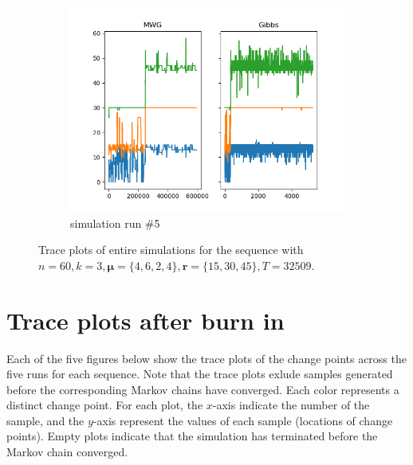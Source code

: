 \begin{figure}[H]
\begin{subfigure}{.3\textwidth}
    	\includegraphics[width=\linewidth]{../../plots/Trace_M4_N60_NMCMC3_seed4_diffind2.png}
		\caption{simulation run \#5}
		\label{fig:eg_before}
	\end{subfigure}
	\caption{Trace plots of entire simulations for the sequence with $n=60, k=3,\bm{\mu} = \{4, 6, 2,4\}, \bm{r} = \{15,30,45\}, T = 32509$.}
\end{figure}

\section{Trace plots after burn in}\label{appendix:trace_burnin}

Each of the five figures below show the trace plots of the change points across the five runs for each sequence. Note that the trace plots exlude samples generated before the corresponding Markov chains have converged. Each color represents a distinct change point. For each plot, the $x$-axis indicate the number of the sample, and the $y$-axis represent the values of each sample (locations of change points).
Empty plots indicate that the simulation has terminated before the Markov chain converged.

